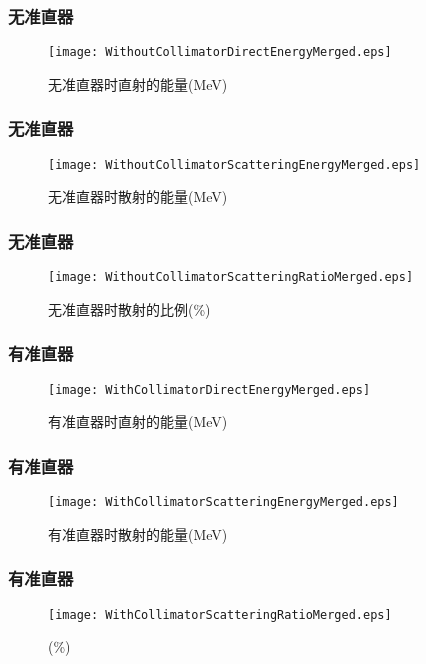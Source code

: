 \documentclass{beamer}
\begin{document}
\begin{CJK*}{UTF8}{gkai}
  \begin{frame}\frametitle{无准直器}
    \begin{figure}[ht]
      \centering
      \texttt{[image: WithoutCollimatorDirectEnergyMerged.eps]}
      \caption{\liuhao 无准直器时直射的能量(MeV)}
    \end{figure}
  \end{frame}
  \begin{frame}\frametitle{无准直器}
    \begin{figure}[ht]
      \centering
      \texttt{[image: WithoutCollimatorScatteringEnergyMerged.eps]}
      \caption{\liuhao 无准直器时散射的能量(MeV)}
    \end{figure}
  \end{frame}
  \begin{frame}\frametitle{无准直器}
    \begin{figure}[ht]
      \centering
      \texttt{[image: WithoutCollimatorScatteringRatioMerged.eps]}
      \caption{\liuhao 无准直器时散射的比例(\%)}
    \end{figure}
  \end{frame}
  \begin{frame}\frametitle{有准直器}
    \begin{figure}[ht]
      \centering
      \texttt{[image: WithCollimatorDirectEnergyMerged.eps]}
      \caption{\liuhao 有准直器时直射的能量(MeV)}
    \end{figure}
  \end{frame}
  \begin{frame}\frametitle{有准直器}
    \begin{figure}[ht]
      \centering
      \texttt{[image: WithCollimatorScatteringEnergyMerged.eps]}
      \caption{\liuhao 有准直器时散射的能量(MeV)}
    \end{figure}
  \end{frame}
  \begin{frame}\frametitle{有准直器}
    \begin{figure}[ht]
      \centering
      \texttt{[image: WithCollimatorScatteringRatioMerged.eps]}
      \caption{(\%)}
    \end{figure}
  \end{frame}

\end{CJK*}
\end{document}

